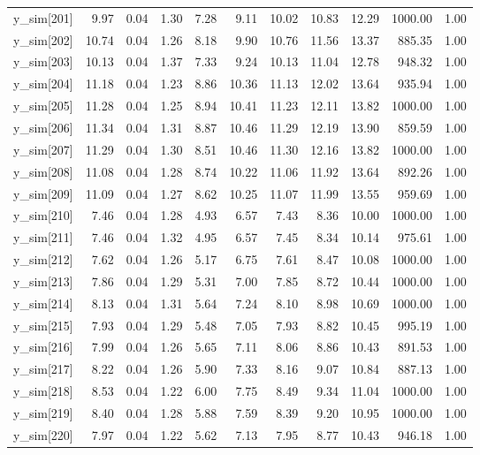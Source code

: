 \begin{table}[ht]
\begin{tabular}{rrrrrrrrrrr}
  y\_sim[201] & 9.97 & 0.04 & 1.30 & 7.28 & 9.11 & 10.02 & 10.83 & 12.29 & 1000.00 & 1.00 \\ 
  y\_sim[202] & 10.74 & 0.04 & 1.26 & 8.18 & 9.90 & 10.76 & 11.56 & 13.37 & 885.35 & 1.00 \\ 
  y\_sim[203] & 10.13 & 0.04 & 1.37 & 7.33 & 9.24 & 10.13 & 11.04 & 12.78 & 948.32 & 1.00 \\ 
  y\_sim[204] & 11.18 & 0.04 & 1.23 & 8.86 & 10.36 & 11.13 & 12.02 & 13.64 & 935.94 & 1.00 \\ 
  y\_sim[205] & 11.28 & 0.04 & 1.25 & 8.94 & 10.41 & 11.23 & 12.11 & 13.82 & 1000.00 & 1.00 \\ 
  y\_sim[206] & 11.34 & 0.04 & 1.31 & 8.87 & 10.46 & 11.29 & 12.19 & 13.90 & 859.59 & 1.00 \\ 
  y\_sim[207] & 11.29 & 0.04 & 1.30 & 8.51 & 10.46 & 11.30 & 12.16 & 13.82 & 1000.00 & 1.00 \\ 
  y\_sim[208] & 11.08 & 0.04 & 1.28 & 8.74 & 10.22 & 11.06 & 11.92 & 13.64 & 892.26 & 1.00 \\ 
  y\_sim[209] & 11.09 & 0.04 & 1.27 & 8.62 & 10.25 & 11.07 & 11.99 & 13.55 & 959.69 & 1.00 \\ 
  y\_sim[210] & 7.46 & 0.04 & 1.28 & 4.93 & 6.57 & 7.43 & 8.36 & 10.00 & 1000.00 & 1.00 \\ 
  y\_sim[211] & 7.46 & 0.04 & 1.32 & 4.95 & 6.57 & 7.45 & 8.34 & 10.14 & 975.61 & 1.00 \\ 
  y\_sim[212] & 7.62 & 0.04 & 1.26 & 5.17 & 6.75 & 7.61 & 8.47 & 10.08 & 1000.00 & 1.00 \\ 
  y\_sim[213] & 7.86 & 0.04 & 1.29 & 5.31 & 7.00 & 7.85 & 8.72 & 10.44 & 1000.00 & 1.00 \\ 
  y\_sim[214] & 8.13 & 0.04 & 1.31 & 5.64 & 7.24 & 8.10 & 8.98 & 10.69 & 1000.00 & 1.00 \\ 
  y\_sim[215] & 7.93 & 0.04 & 1.29 & 5.48 & 7.05 & 7.93 & 8.82 & 10.45 & 995.19 & 1.00 \\ 
  y\_sim[216] & 7.99 & 0.04 & 1.26 & 5.65 & 7.11 & 8.06 & 8.86 & 10.43 & 891.53 & 1.00 \\ 
  y\_sim[217] & 8.22 & 0.04 & 1.26 & 5.90 & 7.33 & 8.16 & 9.07 & 10.84 & 887.13 & 1.00 \\ 
  y\_sim[218] & 8.53 & 0.04 & 1.22 & 6.00 & 7.75 & 8.49 & 9.34 & 11.04 & 1000.00 & 1.00 \\ 
  y\_sim[219] & 8.40 & 0.04 & 1.28 & 5.88 & 7.59 & 8.39 & 9.20 & 10.95 & 1000.00 & 1.00 \\ 
  y\_sim[220] & 7.97 & 0.04 & 1.22 & 5.62 & 7.13 & 7.95 & 8.77 & 10.43 & 946.18 & 1.00 \\ 

\end{tabular}
\end{table}
